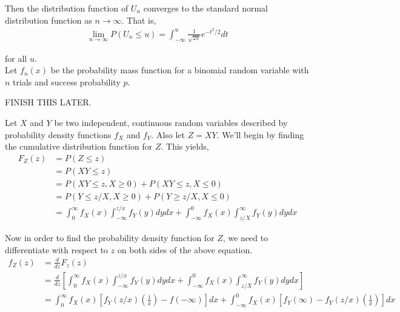 \documentclass[12pt]{article}
\newenvironment{problem}[2][Problem]{\begin{trivlist}
\item[\hskip \labelsep {\bfseries #1}\hskip \labelsep {\bfseries #2.}]}{\end{trivlist}}
\begin{document}
\noindent Then the distribution function of $U_n$ converges to the standard normal distribution function as $n \to \infty$. That is,
\begin{align*}
\lim_{n \to \infty} P(U_n \leq u) = \int_{-\infty}^{u} \frac{1}{\sqrt{2\pi}}e^{-t^2/2}dt
\end{align*}

\noindent for all $u$.\\

\noindent Let $f_n(x)$ be the probability mass function for a binomial random variable with $n$ trials and success probability $p$.

FINISH THIS LATER.

\begin{problem}{8}
\end{problem}

Let $X$ and $Y$ be two independent, continuous random variables described by probability density functions $f_X$ and $f_Y$. Also let $Z = XY$. We'll begin by finding the cumulative distribution function for $Z$. This yields,
\begin{align*}
F_Z(z) &= P(Z \leq z)\\
&= P(XY \leq z)\\
&= P(XY \leq z, X \geq 0) + P(XY \leq z, X \leq 0)\\
&= P(Y \leq z/X, X \geq 0) + P(Y \geq z/X, X \leq 0)\\
&= \int_{0}^{\infty} f_X(x) \int_{-\infty}^{z/x} f_Y(y) dy dx + \int_{-\infty}^0 f_X(x) \int_{z/X}^{\infty} f_Y(y) dy dx
\end{align*}

Now in order to find the probability density function for $Z$, we need to differentiate with respect to $z$ on both sides of the above equation.
\begin{align*}
f_Z(z) &= \frac{d}{dz}F_z(z)\\
&= \frac{d}{dz}\left[\int_{0}^{\infty} f_X(x) \int_{-\infty}^{z/x} f_Y(y) dy dx + \int_{-\infty}^0 f_X(x) \int_{z/X}^{\infty} f_Y(y) dy dx\right]\\
&= \int_{0}^{\infty} f_X(x) \left[f_Y(z/x)\left(\frac{1}{x}\right) - f(-\infty)\right] dx + \int_{-\infty}^{0} f_X(x) \left[f_Y(\infty) - f_Y(z/x)\left(\frac{1}{x}\right)\right] dx
\end{align*}
\end{document}
